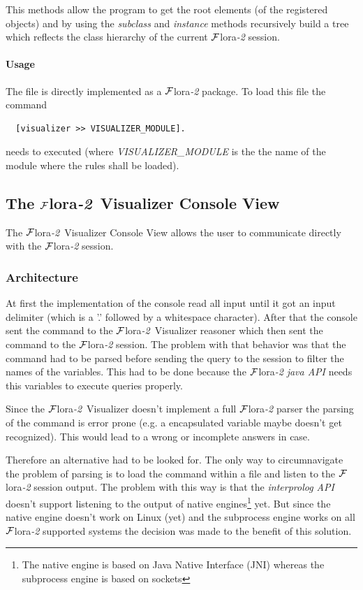 \documentclass[a4paper,11pt]{article}
\newcommand{\FLORA}{{\mbox{\sc ${\cal F}${lora}\rm\emph{-2}}}\xspace}
\newcommand{\FVIZ}{{\mbox{\sc ${\cal F}${lora}\rm\emph{-2} {Visualizer}}}\xspace}
\begin{document}
This methods allow the program to get the root elements (of the
registered objects) and by using the \emph{subclass} and \emph{instance}
methods recursively build a tree which reflects the class hierarchy
of the current \FLORA session.

\paragraph{Usage}
The file is directly implemented as a \FLORA package. To load this file
the command
\begin{verbatim}
  [visualizer >> VISUALIZER_MODULE].
\end{verbatim}
needs to executed (where \emph{VISUALIZER\_MODULE} is the the name of the
module where the rules shall be loaded).

\subsection{The \FVIZ Console View}
\label{sec:floravisualizer_consoleview}
The \FVIZ Console View allows the user to communicate directly with
the \FLORA session.

\subsubsection{Architecture}
\label{sec:floravisualizer_consoleview_architecture}
At first the implementation of the console read all input until it got
an input delimiter (which is a '.' followed by a whitespace character).
After that the console sent the command to the \FVIZ reasoner which then
sent the command to the \FLORA session. The problem with that behavior was
that the command had to be parsed before sending the query to the session
to filter the names of the variables.
This had to be done because the \FLORA
\emph{java API} needs this variables to execute queries properly.

Since the \FVIZ doesn't implement a full \FLORA parser the parsing of
the command is error prone (e.g. a encapsulated variable maybe doesn't get
recognized). This would lead to a wrong or incomplete answers in case.

Therefore an alternative had to be looked for. The only way to
circumnavigate the problem of parsing is to load the command within a file and
listen to the \FLORA session output. The problem with this way is that the
\emph{interprolog API} doesn't support listening to the output of
native engines\footnote{
The native engine is based on Java Native Interface (JNI)
whereas the subprocess engine is based on sockets}
yet. But since the native engine doesn't work on Linux (yet) and
the subprocess engine works on all \FLORA supported systems
the decision was made to the benefit of this solution.
\end{document}
